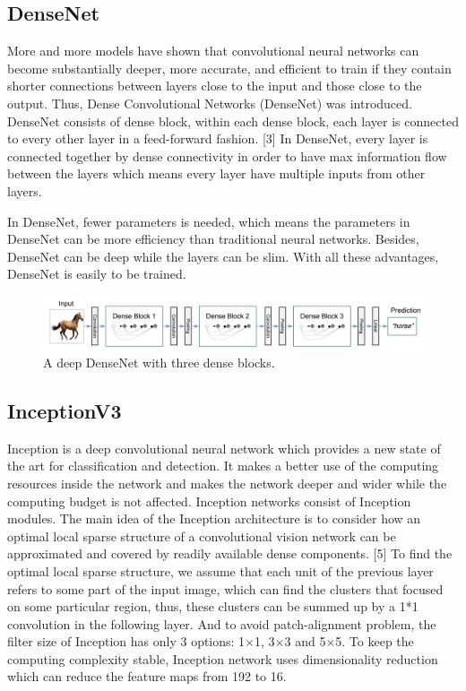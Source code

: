 \documentclass{article}
\begin{document}
\subsection{DenseNet}

More and more models have shown that convolutional neural networks can become substantially deeper, more accurate, and efficient to train if they contain shorter connections between layers close to the input and those close to the output. Thus, Dense Convolutional Networks (DenseNet) was introduced. DenseNet consists of dense block, within each dense block, each layer is connected to every other layer in a feed-forward fashion. [3] In DenseNet, every layer is connected together by dense connectivity in order to have max information flow between the layers which means every layer have multiple inputs from other layers. 

In DenseNet, fewer parameters is needed, which means the parameters in DenseNet can be more efficiency than traditional neural networks. Besides, DenseNet can be deep while the layers can be slim. With all these advantages, DenseNet is easily to be trained.

\begin{figure}[H]
	\centering
	\includegraphics[width=0.8\linewidth]{pics/densenet} 
	\caption{A deep DenseNet with three dense blocks.}
\end{figure}

\subsection{InceptionV3}

Inception is a deep convolutional neural network which provides a new state of the art for classification and detection. It makes a better use of the computing resources inside the network and makes the network deeper and wider while the computing budget is not affected. Inception networks consist of Inception modules. The main idea of the Inception architecture is to consider how an optimal local sparse structure of a convolutional vision network can be approximated and covered by readily available dense components. [5] To find the optimal local sparse structure, we assume that each unit of the previous layer refers to some part of the input image, which can find the clusters that focused on some particular region, thus, these clusters can be summed up by a 1*1 convolution in the following layer. And to avoid patch-alignment problem, the filter size of Inception has only 3 options: 1$\times$1, 3$\times$3 and 5$\times$5. To keep the computing complexity stable, Inception network uses dimensionality reduction which can reduce the feature maps from 192 to 16.
\end{document}
